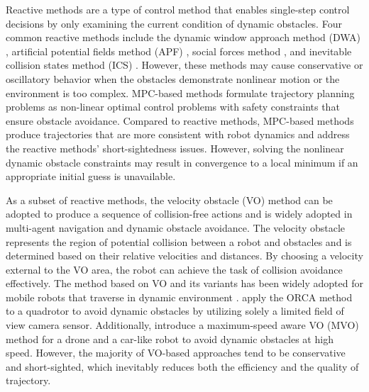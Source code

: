 \documentclass[preprint,5p,times,twocolumn,authoryear]{elsarticle}
\begin{document}
Reactive methods are a type of control method that enables single-step control decisions by only examining the current condition of dynamic obstacles. Four common reactive methods include the dynamic window approach method (DWA) \citep{fox1997dynamic}, artificial potential fields method (APF) \citep{khatib1985real}, social forces method \citep{ferrer2013robot}, and inevitable collision states method (ICS) \citep{petti2005safe}. However, these methods may cause conservative or oscillatory behavior when the obstacles demonstrate nonlinear motion or the environment is too complex. MPC-based methods \citep{jian2022dynamic, zhu2019chance, poonganam2020reactive, wang2022velocity} formulate trajectory planning problems as non-linear optimal control problems with safety constraints that ensure obstacle avoidance. Compared to reactive methods, MPC-based methods produce trajectories that are more consistent with robot dynamics and address the reactive methods’ short-sightedness issues. However, solving the nonlinear dynamic obstacle constraints may result in convergence to a local minimum if an appropriate initial guess is unavailable.

As a subset of reactive methods, the velocity obstacle (VO) \citep{fiorini1998motion} method can be adopted to produce a sequence of collision-free actions and is widely adopted in multi-agent navigation and dynamic obstacle avoidance. The velocity obstacle represents the region of potential collision between a robot and obstacles and is determined based on their relative velocities and distances. By choosing a velocity external to the VO area, the robot can achieve the task of collision avoidance effectively. The method based on VO and its variants has been widely adopted for mobile robots that traverse in dynamic environment \citep{chen2021velocity, han2022reinforcement, roelofsen2015reciprocal, xu2020collision}. \cite{roelofsen2015reciprocal} apply the ORCA \citep{van2008reciprocal} method to a quadrotor to avoid dynamic obstacles by utilizing solely a limited field of view camera sensor. Additionally, \cite{xu2020collision} introduce a maximum-speed aware VO (MVO) method for a drone and a car-like robot to avoid dynamic obstacles at high speed. However, the majority of VO-based approaches tend to be conservative and short-sighted, which inevitably reduces both the efficiency and the quality of trajectory.
\end{document}
